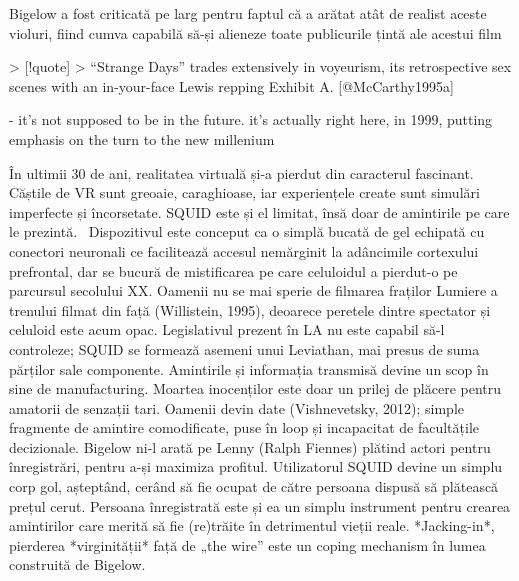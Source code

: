 \documentclass[12pt]{article}
\begin{document}
Bigelow a fost criticată pe larg pentru faptul că a arătat atât de realist aceste violuri, fiind cumva capabilă să-și alieneze toate publicurile țintă ale acestui film

> [!quote]
> “Strange Days” trades extensively in voyeurism, its retrospective sex scenes with an in-your-face Lewis repping Exhibit A. [@McCarthy1995a]



- it's not supposed to be in the future. it's actually right here, in 1999, putting emphasis on the turn to the new millenium

În ultimii 30 de ani, realitatea virtuală și-a pierdut din caracterul fascinant. Căștile de VR sunt greoaie, caraghioase, iar experiențele create sunt simulări imperfecte și încorsetate. SQUID este și el limitat, însă doar de amintirile pe care le prezintă. 
Dispozitivul este conceput ca o simplă bucată de gel echipată cu conectori neuronali ce facilitează accesul nemărginit la adâncimile cortexului prefrontal, dar se bucură de mistificarea pe care celuloidul a pierdut-o pe parcursul secolului XX. Oamenii nu se mai sperie de filmarea fraților Lumiere a trenului filmat din față (Willistein, 1995), deoarece peretele dintre spectator și celuloid este acum opac.
Legislativul prezent în LA nu este capabil să-l controleze; SQUID se formează asemeni unui Leviathan, mai presus de suma părților sale componente.
Amintirile și informația transmisă devine un scop în sine de manufacturing. Moartea inocenților este doar un prilej de plăcere pentru amatorii de senzații tari. Oamenii devin date (Vishnevetsky, 2012); simple fragmente de amintire comodificate, puse în loop și incapacitat de facultățile decizionale. Bigelow ni-l arată pe Lenny (Ralph Fiennes) plătind actori pentru înregistrări, pentru a-și maximiza profitul. Utilizatorul SQUID devine un simplu corp gol, așteptând, cerând să fie ocupat de către persoana dispusă să plătească prețul cerut. Persoana înregistrată este și ea un simplu instrument pentru crearea amintirilor care merită să fie (re)trăite în detrimentul vieții reale.
*Jacking-in*, pierderea *virginității* față de „the wire” este un coping mechanism în lumea construită de Bigelow. 
\end{document}
